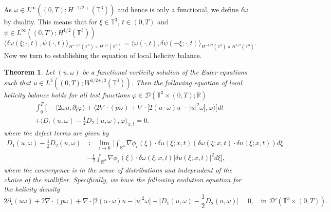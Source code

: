 \documentclass[12pt,a4paper]{article}
\newtheorem{theorem}{Theorem}[section]
\theoremstyle{definition}
\theoremstyle{remark}
\numberwithin{equation}{section}
\begin{document}
As $\omega \in L^\infty ((0,T); H^{-1/2+} (\mathbb{T}^3))$ and hence is only a functional, we define $\delta \omega$ by duality. This means that for $\xi \in \mathbb{T}^3$, $t \in (0,T)$ and $\psi \in L^\infty ((0,T); H^{1/2} (\mathbb{T}^3))$
\begin{equation} \label{dualityincrement}
\langle \delta \omega (\xi; \cdot, t) , \psi (\cdot, t) \rangle_{H^{-1/2} (\mathbb{T}^3) \times H^{1/2} (\mathbb{T}^3)} = \langle \omega (\cdot, t) , \delta \psi (-\xi; \cdot, t) \rangle_{H^{-1/2} (\mathbb{T}^3) \times H^{1/2} (\mathbb{T}^3)}.
\end{equation}
Now we turn to establishing the equation of local helicity balance. 
\begin{theorem} \label{helicitybalance}
Let $(u,\omega)$ be a functional vorticity solution of the Euler equations such that $u \in L^3 ((0,T); W^{1/2+,3} (\mathbb{T}^3))$. Then the following equation of local helicity balance holds for all test functions $\varphi \in \mathcal{D} (\mathbb{T}^3 \times (0,T); \mathbb{R})$
\begin{align}
&\int_0^T \bigg[ - \bigg\langle 2 \omega u, \partial_t \varphi \bigg\rangle + \bigg\langle  2 \nabla \cdot (p \omega) + \nabla \cdot \big[ 2 (u \cdot \omega) u - \lvert u \rvert^2 \omega \big], \varphi \bigg\rangle \bigg] dt \nonumber \\
&+ \bigg\langle D_{1} (u, \omega) - \frac{1}{2} D_{2} (u, \omega) ,  \varphi \bigg\rangle_{x,t} = 0. \label{localhelicitybalance}
\end{align}
where the defect terms are given by
\begin{align}
D_1 (u,\omega) - \frac{1}{2} D_2 (u, \omega) &\coloneqq \lim_{\epsilon \rightarrow 0} \bigg[\int_{\mathbb{R}^3} \nabla \phi_\epsilon (\xi) \cdot \delta u (\xi ; x,t) (\delta \omega (\xi ;x,t) \cdot \delta u (\xi ; x, t) ) d \xi \nonumber \\
&- \frac{1}{2} \int_{\mathbb{R}^3} \nabla \phi_\epsilon (\xi) \cdot \delta \omega (\xi ; x,t) \lvert \delta u (\xi ;x,t) \rvert^2 d \xi \bigg],
\end{align}
where the convergence is in the sense of distributions and independent of the choice of the mollifier. Specifically, we have the following evolution equation for the helicity density
\begin{equation}
2 \partial_t (u \omega) + 2 \nabla \cdot (p \omega) + \nabla \cdot \big[2 (u \cdot \omega) u - \lvert u \rvert^2 \omega \big] + \bigg[ D_1 (u,\omega) - \frac{1}{2} D_2 (u, \omega) \bigg] = 0, \quad \text{in } \mathcal{D}' (\mathbb{T}^3 \times (0,T)).
\end{equation}
\end{theorem}
\end{document}
